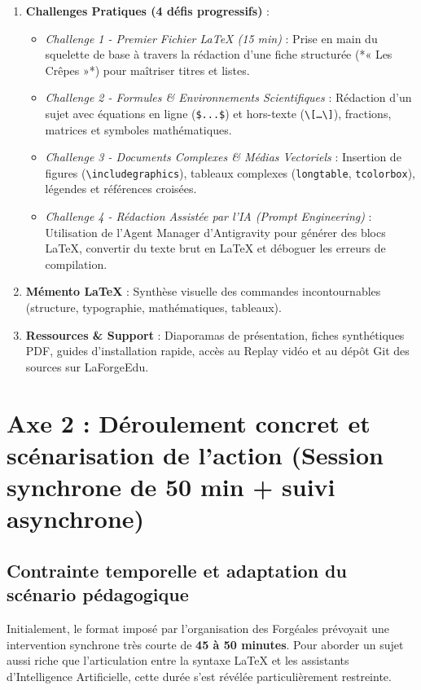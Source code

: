 \begin{enumerate}
    \item \textbf{Challenges Pratiques (4 défis progressifs)} :
    \begin{itemize}[leftmargin=*]
        \item \textit{Challenge 1 - Premier Fichier \LaTeX{} (15 min)} : Prise en main du squelette de base à travers la rédaction d'une fiche structurée (*« Les Crêpes »*) pour maîtriser titres et listes.
        \item \textit{Challenge 2 - Formules \& Environnements Scientifiques} : Rédaction d'un sujet avec équations en ligne (\texttt{\$...\$}) et hors-texte (\texttt{\textbackslash[\dots\textbackslash]}), fractions, matrices et symboles mathématiques.
        \item \textit{Challenge 3 - Documents Complexes \& Médias Vectoriels} : Insertion de figures (\texttt{\textbackslash includegraphics}), tableaux complexes (\texttt{longtable}, \texttt{tcolorbox}), légendes et références croisées.
        \item \textit{Challenge 4 - Rédaction Assistée par l'IA (Prompt Engineering)} : Utilisation de l'Agent Manager d'Antigravity pour générer des blocs \LaTeX{}, convertir du texte brut en \LaTeX{} et déboguer les erreurs de compilation.
    \end{itemize}
    
    \item \textbf{Mémento \LaTeX{}} : Synthèse visuelle des commandes incontournables (structure, typographie, mathématiques, tableaux).
    \item \textbf{Ressources \& Support} : Diaporamas de présentation, fiches synthétiques PDF, guides d'installation rapide, accès au Replay vidéo et au dépôt Git des sources sur LaForgeEdu.
\end{enumerate}

\section{Axe 2 : Déroulement concret et scénarisation de l'action (Session synchrone de 50 min + suivi asynchrone)}

\subsection{Contrainte temporelle et adaptation du scénario pédagogique}

Initialement, le format imposé par l'organisation des Forgéales prévoyait une intervention synchrone très courte de \textbf{45 à 50 minutes}. Pour aborder un sujet aussi riche que l'articulation entre la syntaxe \LaTeX{} et les assistants d'Intelligence Artificielle, cette durée s'est révélée particulièrement restreinte.

